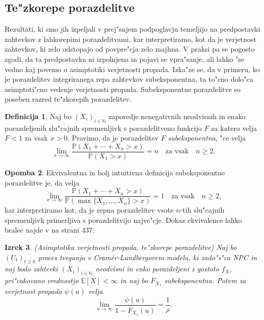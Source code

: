 \documentclass[12pt, a4paper, reqno]{amsart}
\theoremstyle{definition}
\newtheorem{definicija}{Definicija}[section]
\newtheorem{opomba}[definicija]{Opomba}
\theoremstyle{plain}
\newtheorem{izrek}[definicija]{Izrek}
\newcommand{\N}{\mathbb{N}}
\newcommand{\E}{\mathbb{E}}
\newcommand{\Prob}{\mathbb{P}}
\newcommand{\1}{\mathds{1}}
\begin{document}
        
    \subsection{Te"zkorepe porazdelitve}
        Rezultati, ki smo jih izpeljali v prej"snjem podpoglavju temeljijo na predpostavki zahtevkov
        z lahkorepimi porazdelitvami, kar interpretiramo, kot da je verjetnost zahtevkov, ki zelo 
        odstopajo od povpre"cja zelo majhna. V praksi pa se pogosto zgodi, da ta predpostavka ni 
        izpolnjena in pojavi se vpra"sanje, ali lahko "se vedno kaj povemo o asimptotiki verjetnosti 
        propada. Izka"ze se, da v primeru, ko je porazdelitev 
        integriranega repa zahtevkov subeksponentna, ta to"cno dolo"ca asimptoti"cno vedenje verjetnosti 
        propada. Subeksponentne porazdelitve so poseben razred te"zkorepih porazdelitev. 
        \begin{definicija}
            Naj bo $(X_i)_{i\in\N}$ zaporedje nenegativnih neodvisnih in enako porazdeljenih 
            slu"cajnih spremenljivk s porazdelitveno funkcijo $F$ za katero velja $F<1$ za vsak $x > 0$.
            Pravimo, da je porazdelitev $F$ \textit{subeksponentna}, "ce velja 
            \begin{equation*}
                \lim_{x\to\infty}\frac{\Prob\left(X_1 + \cdots + X_n > x\right)}{\Prob\left(X_1 > x\right)} = n \quad \text{za vsak} \quad n\geq2.
            \end{equation*}
            \label{def:subeksponentnaPorazdelitev}
        \end{definicija}

        \begin{opomba}
            Ekvivalentna in bolj intuitivna definicija subeksponentne porazdelitve je, da velja 
            \begin{equation*}
                \lim_{x\to\infty}\frac{\Prob\left(X_1 + \cdots + X_n > x\right)}{\Prob\left(\max\{X_1, \dots, X_n\} > x\right)} = 1 \quad \text{za vsak} \quad n\geq2, 
            \end{equation*}
            kar interpretiramo kot, da je repna porazdelitev vsote $n$-tih slu"cajnih spremenljivk 
            primerljiva s porazdelitvijo najve"cje. Dokaz ekvivalence lahko bralec najde v \cite{9} na strani $437$.
        \end{opomba}
        
        \begin{izrek}(Asimptotika verjetnosti propada, te"zkorepe porazdelitve)
            Naj bo $(U_t)_{t\geq0}$ proces tveganja v Cramér-Lundbergovem modelu, ki zado"s"ca NPC in 
            naj bodo zahtevki $(X_i)_{i\in\N}$ neodvisni in enko porazdeljeni z gostoto $f_X$, 
            pri"cakovano vrednostjo $\E\left[X\right] < \infty$ in naj bo $\overline{F}_{X_1}$ subeksponentna.
            Potem za verjetnost propada $\psi(u)$ velja
            \begin{equation}
                \lim_{u\to\infty}\frac{\psi(u)}{1 - \overline{F}_{X_1}(u)} = \frac{1}{\rho}.
                \label{eq:tezkorepnePorazdelitveAsimptotika}
            \end{equation}
            \label{izr:tezkorepnePorazdelitveAsimptotika}
        \end{izrek}
\end{document}
